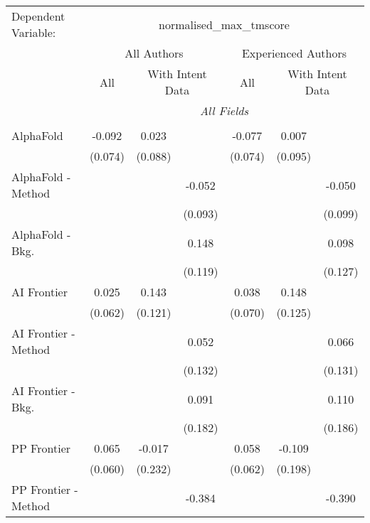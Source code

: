 \begingroup
\centering
\begin{tabular}{lcccccc}
   \tabularnewline \midrule \midrule
   Dependent Variable: & \multicolumn{6}{c}{normalised\_max\_tmscore}\\
 & \multicolumn{3}{c}{All Authors} & \multicolumn{3}{c}{Experienced Authors} \\
\cmidrule(lr){2-4} \cmidrule(lr){5-7}
 & \multicolumn{1}{c}{All} & \multicolumn{2}{c}{With Intent Data} & \multicolumn{1}{c}{All} & \multicolumn{2}{c}{With Intent Data} \\
\cmidrule(lr){2-2} \cmidrule(lr){3-4} \cmidrule(lr){5-5} \cmidrule(lr){6-7}
 & \multicolumn{6}{c}{\textit{All Fields}} \\ \\
   AlphaFold            & -0.092  & 0.023   &         & -0.077  & 0.007   &   \\   
                        & (0.074) & (0.088) &         & (0.074) & (0.095) &   \\   
   AlphaFold - Method   &         &         & -0.052  &         &         & -0.050\\   
                        &         &         & (0.093) &         &         & (0.099)\\   
   AlphaFold - Bkg.     &         &         & 0.148   &         &         & 0.098\\   
                        &         &         & (0.119) &         &         & (0.127)\\   
   AI Frontier          & 0.025   & 0.143   &         & 0.038   & 0.148   &   \\   
                        & (0.062) & (0.121) &         & (0.070) & (0.125) &   \\   
   AI Frontier - Method &         &         & 0.052   &         &         & 0.066\\   
                        &         &         & (0.132) &         &         & (0.131)\\   
   AI Frontier - Bkg.   &         &         & 0.091   &         &         & 0.110\\   
                        &         &         & (0.182) &         &         & (0.186)\\   
   PP Frontier          & 0.065   & -0.017  &         & 0.058   & -0.109  &   \\   
                        & (0.060) & (0.232) &         & (0.062) & (0.198) &   \\   
   PP Frontier - Method &         &         & -0.384  &         &         & -0.390\\   

\end{tabular}
